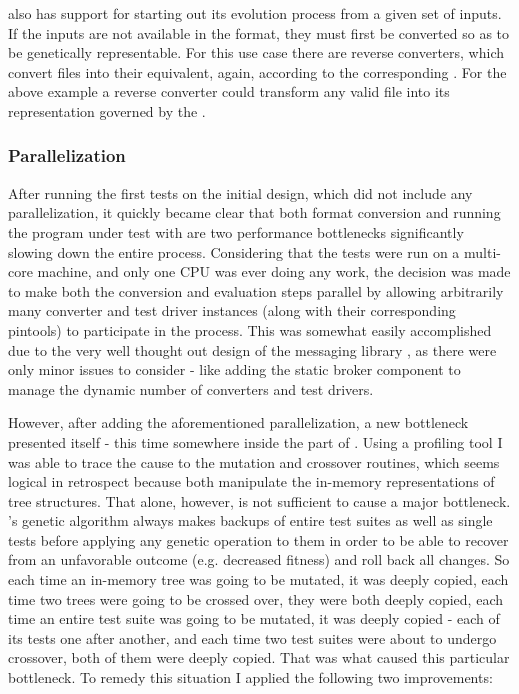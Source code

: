 \xmlmate also has support for starting out its evolution process from a given set of inputs. If the   
inputs are not available in the \xml format, they must first be converted so as to be genetically 
representable. For this use case there are reverse converters, which convert files into their 
\xml equivalent, again, according to the corresponding \xsd. For the above example a reverse converter 
could transform any valid \pcap file into its \xml representation governed by the \pcap{} \xsd.
\subsubsection{Parallelization}
\label{sec:par}
After running the first tests on the initial \xmlmate design, which did not include any parallelization, 
it quickly became clear that both format conversion and running the program under test with \pin 
are two performance bottlenecks significantly slowing down the entire process. Considering that the 
tests were run on a multi-core machine, and only one CPU was ever doing any work, the decision was 
made to make both the conversion and evaluation steps parallel by allowing arbitrarily many 
converter and test driver instances (along with their corresponding pintools) to participate in the process. 
This was somewhat easily accomplished due to the very well thought out design of the messaging library \zmq, 
as there were only minor issues to consider - like adding the static broker component to 
manage the dynamic number of converters and test drivers.

However, after adding the aforementioned parallelization, a new bottleneck presented itself - this time 
somewhere inside the \java part of \xmlmate. Using a \java profiling tool I was able to trace the cause 
to the mutation and crossover routines, which seems logical in retrospect because both manipulate the 
in-memory representations of \xml tree structures. That alone, however, is not sufficient to cause a 
major bottleneck. \evosuite's genetic algorithm always makes backups of entire test suites as well as 
single tests before applying any genetic operation to them in order to be able to recover from an 
unfavorable outcome (e.g. decreased fitness) and roll back all changes. So each time an in-memory \xml 
tree was going to be mutated, it was deeply copied, each time two \xml trees were going to be crossed 
over, they were both deeply copied, each time an entire test suite was going to be mutated, it was 
deeply copied - each of its tests one after another, and each time two test suites were about to 
undergo crossover, both of them were deeply copied. That was what caused this particular bottleneck. 
To remedy this situation I applied the following two improvements:

